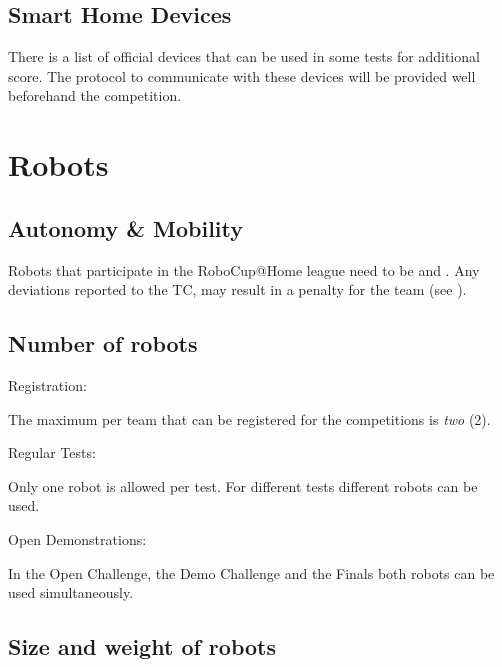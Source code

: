 \subsection{Smart Home Devices}\label{rule:smarthomedevices}

There is a list of official devices that can be used in some tests for additional score.
The protocol to communicate with these devices will be provided well beforehand the
competition.


\section{Robots}\label{rule:robots}

\subsection{Autonomy \& Mobility}
Robots that participate in the RoboCup@Home league need to be
 and .
Any deviations reported to the TC, may result in a penalty for the team (see ).


\subsection{Number of robots}\label{rule:robots_number}

\begin{enumerate}
{\bf\item Registration:} The maximum  per team that can be registered for the competitions is \emph{two} (2).
{\bf\item Regular Tests:} Only one robot is allowed per test. 
  For different tests different robots can be used.
{\bf\item Open Demonstrations:} In the Open Challenge, the Demo Challenge and the Finals both robots can be used simultaneously.
\end{enumerate}


\subsection{Size and weight of robots}\label{rule:robots_size}

